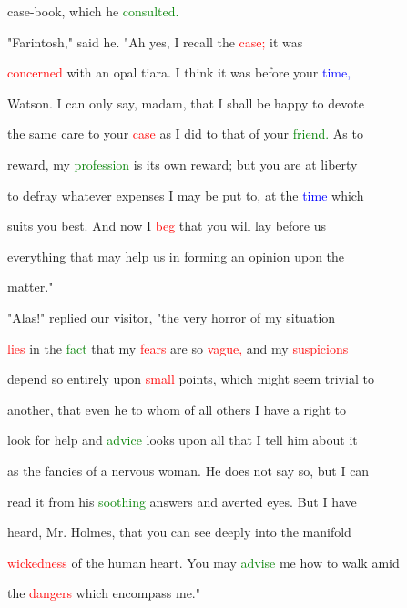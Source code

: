  case-book, which he \textcolor{green}{consulted.}



 "Farintosh," said he. "Ah yes, I recall the \textcolor{red}{case;} it was

 \textcolor{red}{concerned} with an opal tiara. I think it was before your \textcolor{blue}{time,}

 Watson. I can only say, madam, that I shall be \textcolor{BurntOrange}{happy} to devote

 the same care to your \textcolor{red}{case} as I did to that of your \textcolor{green}{friend.} As to

 \textcolor{BurntOrange}{reward,} my \textcolor{green}{profession} is its own \textcolor{BurntOrange}{reward;} but you are at \textcolor{BurntOrange}{liberty}

 to defray whatever expenses I may be put to, at the \textcolor{blue}{time} which

 suits you best. And now I \textcolor{red}{beg} that you will lay before us

 everything that may help us in forming an opinion upon the

 matter."



 "Alas!" replied our \textcolor{BurntOrange}{visitor,} "the very \textcolor{BurntOrange}{horror} of my situation

 \textcolor{red}{lies} in the \textcolor{green}{fact} that my \textcolor{red}{fears} are so \textcolor{red}{vague,} and my \textcolor{red}{suspicions}

 \textcolor{BurntOrange}{depend} so entirely upon \textcolor{red}{small} points, which might seem trivial to

 another, that even he to whom of all others I have a right to

 look for help and \textcolor{green}{advice} looks upon all that I tell him about it

 as the \textcolor{BurntOrange}{fancies} of a \textcolor{BurntOrange}{nervous} woman. He does not say so, but I can

 read it from his \textcolor{green}{soothing} answers and averted eyes. But I have

 heard, Mr. Holmes, that you can see deeply into the manifold

 \textcolor{red}{wickedness} of the human heart. You may \textcolor{green}{advise} me how to walk amid

 the \textcolor{red}{dangers} which encompass me."



